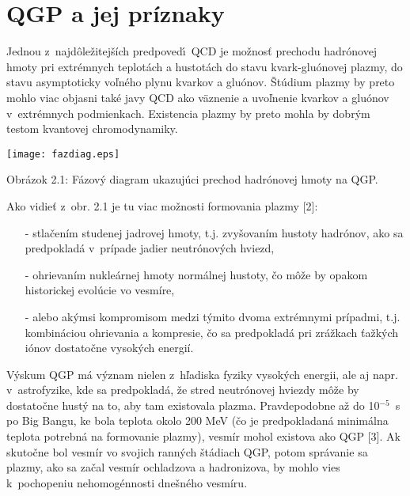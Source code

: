 \chapter{QGP a jej príznaky}
Jednou z~najdôležitejších predpoved\'\i\ QCD je možnosť
prechodu hadrónovej hmo\-ty pri extrémnych teplotách a hustotách
do stavu kvark-gluónovej plazmy, do stavu asymptoticky voľného
plynu kvarkov a gluónov. Štúdium plazmy by preto mohlo viac 
objasni\softt{} také javy QCD ako väznenie a uvoľnenie
kvarkov  a gluónov v~extrémnych podmienkach. Existencia
plazmy by preto mohla by\softt{} dobrým testom kvantovej chromodynamiky.

\begin{center}
\texttt{[image: fazdiag.eps]}
\end{center}

\begin{center}
Obrázok 2.1: Fázový diagram ukazujúci prechod hadrónovej hmoty na QGP.
\end{center}
\newpage
Ako vidieť z~obr. 2.1 je tu viac možnosti formovania plazmy [2]:

\begin{itemize}
\item[-] stlačením studenej jadrovej hmoty, t.j. zvyšovaním
hustoty hadrónov, ako sa predpokladá  v~prípade  jadier neutrónových
hviezd,
\item[-] ohrievaním nukleárnej hmoty normálnej hustoty,  čo
môže by\softt{} opakom historickej  evolúcie vo vesmíre,
\item[-] alebo akýmsi kompromisom medzi týmito dvoma extrémnymi 
prípadmi, t.j. kombináciou ohrievania a kompresie, čo sa
predpokladá pri zrážkach ťažkých iónov dostatočne vysokých
energií.
\end{itemize}

Výskum QGP má význam nielen z~hľadiska fyziky vysokých energii, 
ale aj napr. v~astrofyzike, kde sa predpokladá, že stred neutrónovej 
hviezdy môže  by\softt{} dostatočne hustý na to, aby tam existovala
plazma. Pravdepodobne až do 10$^{-5}$~s po Big Bangu, ke\softd{} bola
teplota okolo 200 MeV (čo je predpokladaná minimálna teplota 
potrebná na formovanie plazmy), vesmír mohol existova\softt{} ako QGP
[3]. Ak  skutočne bol vesmír vo svojich ranných
štádiach QGP, potom správanie sa  plazmy, ako sa začal vesmír
ochladzova\softt{} a hadronizova\softt{}, by mohlo vies\softt{}  k~pochopeniu
nehomogénnosti dnešného vesmíru. 

